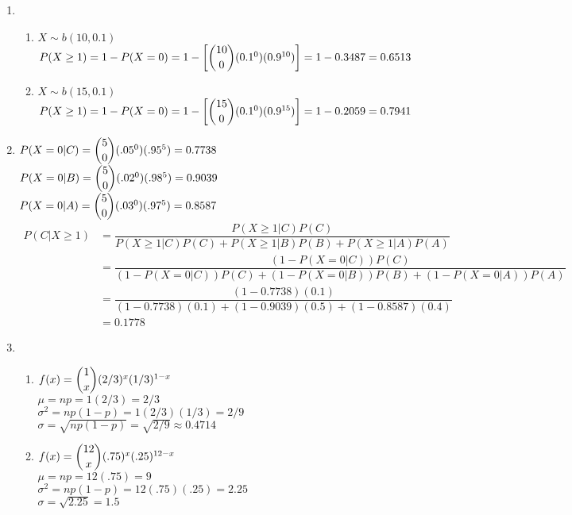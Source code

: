 \documentclass{article}
\begin{document}
\begin{enumerate}
     \item
      \begin{enumerate}
       \item 
	$X \sim b(10,0.1)$\\
	$P(X \ge 1) = 1 - P(X = 0) = 1 - \left[\dbinom{10}{0}(0.1^0)(0.9^{10})\right] = 1 - 0.3487
	  = 0.6513$
       \item
	$X \sim b(15,0.1)$\\
	$P(X \ge 1) = 1 - P(X = 0) = 1 - \left[\dbinom{15}{0}(0.1^0)(0.9^{15})\right] = 1 - 0.2059
	  = 0.7941$
      \end{enumerate}
     \addtocounter{enumi}{1}
      
     \item
      $P(X = 0 | C) = \dbinom{5}{0}(.05^0)(.95^5) = 0.7738$\\
      $P(X = 0 | B) = \dbinom{5}{0}(.02^0)(.98^5) = 0.9039$\\
      $P(X = 0 | A) = \dbinom{5}{0}(.03^0)(.97^5) = 0.8587$\\
      \begin{align*}
       P(C | X \ge 1) &= \dfrac{P(X \ge 1 | C) P(C)}{P(X \ge 1 | C)P(C) + P(X \ge 1|B)P(B) + 
			    P(X \ge 1|A)P(A)} \\
	&= \dfrac{(1 - P(X = 0|C))P(C)}{(1-P(X = 0|C))P(C) + (1-P(X = 0|B))P(B) + (1-P(X=0|A))P(A)} \\
	&= \dfrac{(1 - 0.7738)(0.1)}{(1-0.7738)(0.1) + (1-0.9039)(0.5) + (1-0.8587)(0.4)} \\
	&= 0.1778
      \end{align*}
     \addtocounter{enumi}{3}
     
     \item
      \begin{enumerate}
       \item 
	$f(x) = \dbinom{1}{x}(2/3)^x(1/3)^{1-x}$\\
	$\mu = np = 1(2/3) = 2/3$ \\
	$\sigma^2 = np(1-p) = 1(2/3)(1/3) = 2/9$ \\
	$\sigma = \sqrt{np(1-p)} = \sqrt{2/9} \approx 0.4714$
	
       \item
	$f(x) = \dbinom{12}{x}(.75)^x(.25)^{12-x}$\\
	$\mu = np = 12(.75) = 9$ \\
	$\sigma^2 = np(1-p) = 12(.75)(.25) = 2.25$ \\
	$\sigma = \sqrt{2.25} = 1.5$
      \end{enumerate}


\end{enumerate}
\end{document}
